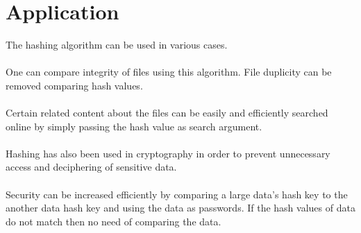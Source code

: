 \chapter{Application}
The hashing algorithm can be used in various cases.
\\~\\
One can compare integrity of files using this algorithm. 
File duplicity can be removed comparing hash values.
\\~\\
Certain related content about the files can be easily and efficiently searched online by simply passing the hash value as search argument.
\\~\\
Hashing has also been used in cryptography in order to prevent unnecessary access and deciphering of sensitive data.
\\~\\
Security can be increased efficiently by comparing a large data’s hash key to the another data hash key and using the data as passwords. If the hash values of data do not match then no need of comparing the data.